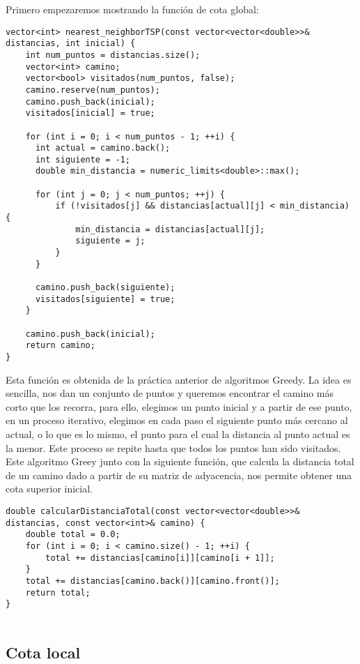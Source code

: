 \documentclass[11pt,openany]{book}
\begin{document}
Primero empezaremos mostrando la función de cota global:
\begin{lstlisting}
vector<int> nearest_neighborTSP(const vector<vector<double>>& distancias, int inicial) {
    int num_puntos = distancias.size();
    vector<int> camino;
    vector<bool> visitados(num_puntos, false);
    camino.reserve(num_puntos);
    camino.push_back(inicial);
    visitados[inicial] = true;

    for (int i = 0; i < num_puntos - 1; ++i) {
      int actual = camino.back();
      int siguiente = -1;
      double min_distancia = numeric_limits<double>::max();

      for (int j = 0; j < num_puntos; ++j) {
          if (!visitados[j] && distancias[actual][j] < min_distancia) {
              min_distancia = distancias[actual][j];
              siguiente = j;
          }
      }

      camino.push_back(siguiente);
      visitados[siguiente] = true;
    }

    camino.push_back(inicial);
    return camino;
}

\end{lstlisting} 
Esta función es obtenida de la práctica anterior de algoritmos Greedy. La idea es sencilla, nos dan un conjunto de 
puntos y queremos encontrar el camino más corto que los recorra, para ello, elegimos un punto inicial y a partir de 
ese punto, en un proceso iterativo, elegimos en cada paso el siguiente punto más cercano al actual, o lo que es lo mismo, 
el punto para el cual la distancia al punto actual es la menor. Este proceso se repite hasta que 
todos los puntos han sido visitados.
Este algoritmo Greey junto con la siguiente función, que calcula la distancia total de un camino dado a partir de su matriz
de adyacencia, nos permite obtener una cota superior inicial.
\\ 
\begin{lstlisting}
double calcularDistanciaTotal(const vector<vector<double>>& distancias, const vector<int>& camino) {
    double total = 0.0;
    for (int i = 0; i < camino.size() - 1; ++i) {
        total += distancias[camino[i]][camino[i + 1]];
    }
    total += distancias[camino.back()][camino.front()];
    return total;
}
      
\end{lstlisting}
\subsection{Cota local}
\end{document}

